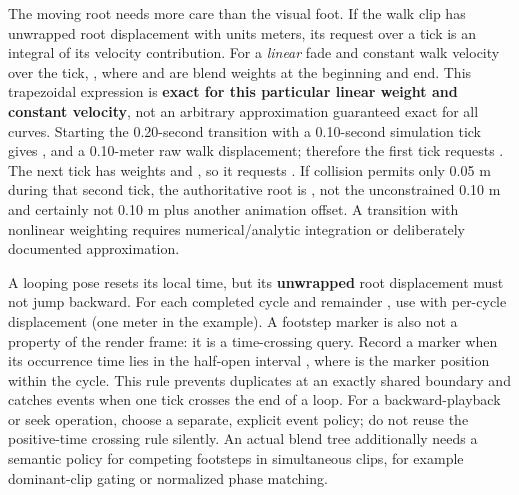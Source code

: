 The moving root needs more care than the visual foot. If the walk clip has unwrapped root displacement  with units meters, its request over a tick is an integral of its velocity contribution. For a \emph{linear} fade and constant walk velocity over the tick, , where  and  are blend weights at the beginning and end. This trapezoidal expression is \textbf{exact for this particular linear weight and constant velocity}, not an arbitrary approximation guaranteed exact for all curves. Starting the 0.20-second transition with a 0.10-second simulation tick gives , and a 0.10-meter raw walk displacement; therefore the first tick requests . The next tick has weights  and , so it requests . If collision permits only 0.05 m during that second tick, the authoritative root is , not the unconstrained 0.10 m and certainly not 0.10 m plus another animation offset. A transition with nonlinear weighting requires numerical/analytic integration or deliberately documented approximation.

A looping pose resets its local time, but its \textbf{unwrapped} root displacement must not jump backward. For each completed cycle  and remainder , use  with per-cycle displacement  (one meter in the example). A footstep marker is also not a property of the render frame: it is a time-crossing query. Record a marker when its occurrence time  lies in the half-open interval \BookInlineCode{(previousTickTime,currentTickTime{]}}, where  is the marker position within the cycle. This rule prevents duplicates at an exactly shared boundary and catches events when one tick crosses the end of a loop. For a backward-playback or seek operation, choose a separate, explicit event policy; do not reuse the positive-time crossing rule silently. An actual blend tree additionally needs a semantic policy for competing footsteps in simultaneous clips, for example dominant-clip gating or normalized phase matching.


